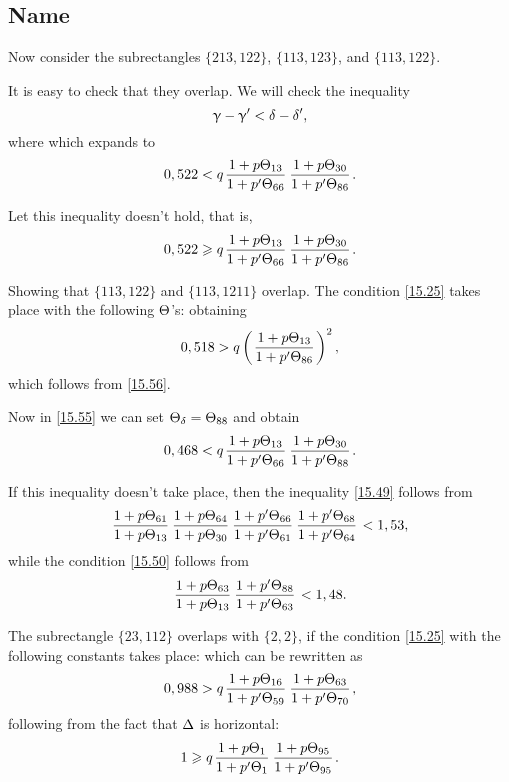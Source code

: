 \subsection{Name}

Now consider the subrectangles $\{213, 122\}$, $\{113, 123\}$, and $\{113, 122\}$.

It is easy to check that they overlap.
We will check the inequality
\begin{equation}\label{15.55}
	\upgamma - \upgamma' < \delta - \delta',
\end{equation}
where
which expands to
\begin{equation*}
	0,522 < q \up{13}{66} \up{30}{86}.
\end{equation*}

Let this inequality doesn't hold, that is,
\begin{equation}\label{15.56}
	0,522 \geqslant q \up{13}{66} \up{30}{86}.
\end{equation}

Showing that $\{113, 122\}$ and $\{113, 1211\}$ overlap.
The condition \ref{15.25} takes place with the following $\Theta$'s:
obtaining
\begin{equation*}
	0,518 > q \left(\mkern 2mu \dfrac{1 + {p} \Theta_{13}}{1 + {p'} \Theta_{86}} \mkern 2mu\right)^2,
\end{equation*}
which follows from \ref{15.56}.

Now in \ref{15.55} we can set $\Theta_{\delta} = \Theta_{88}$ and obtain
\begin{equation*}
	0,468 < q \up{13}{66} \up{30}{88}.
\end{equation*}

If this inequality doesn't take place, then the inequality \ref{15.49} follows from
\begin{equation*}
	\uu{61}{13} \uu{64}{30} \pp{66}{61} \pp{68}{64} < 1,53,
\end{equation*}
while the condition \ref{15.50} follows from
\begin{equation*}
	\uu{63}{13} \pp{88}{63} < 1,48.
\end{equation*}

The subrectangle $\{23, 112\}$ overlaps with $\{2, 2\}$,
if the condition \ref{15.25} with the following constants takes place:
which can be rewritten as
\begin{equation*}
	0,988 > q \up{16}{59} \up{63}{70},
\end{equation*}
following from the fact that $\Delta$ is horizontal:
\begin{equation*}
	1 \geqslant q \up{1}{1} \up{95}{95}.
\end{equation*}

